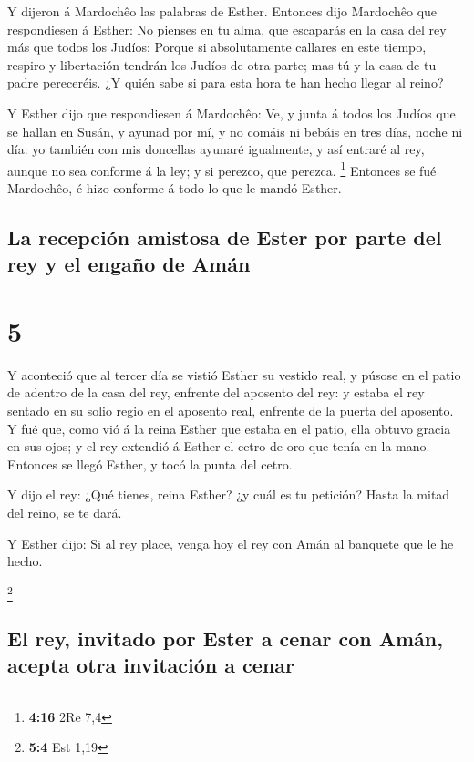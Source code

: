  Y dijeron á Mardochêo las palabras de Esther.
 Entonces dijo Mardochêo que respondiesen á Esther: No
pienses en tu alma, que escaparás en la casa del rey más que todos los
Judíos:  Porque si absolutamente callares en este tiempo,
respiro y libertación tendrán los Judíos de otra parte; mas tú y la casa
de tu padre pereceréis. ¿Y quién sabe si para esta hora te han hecho
llegar al reino?

 Y Esther dijo que respondiesen á Mardochêo: 
Ve, y junta á todos los Judíos que se hallan en Susán, y ayunad por mí,
y no comáis ni bebáis en tres días, noche ni día: yo también con mis
doncellas ayunaré igualmente, y así entraré al rey, aunque no sea
conforme á la ley; y si perezco, que perezca. \footnote{\textbf{4:16}
  2Re 7,4}  Entonces se fué Mardochêo, é hizo conforme á
todo lo que le mandó Esther.

\hypertarget{la-recepciuxf3n-amistosa-de-ester-por-parte-del-rey-y-el-engauxf1o-de-amuxe1n}{%
\subsection{La recepción amistosa de Ester por parte del rey y el engaño
de
Amán}\label{la-recepciuxf3n-amistosa-de-ester-por-parte-del-rey-y-el-engauxf1o-de-amuxe1n}}

\hypertarget{section-4}{%
\section{5}\label{section-4}}

 Y aconteció que al tercer día se vistió Esther su vestido
real, y púsose en el patio de adentro de la casa del rey, enfrente del
aposento del rey: y estaba el rey sentado en su solio regio en el
aposento real, enfrente de la puerta del aposento.  Y fué
que, como vió á la reina Esther que estaba en el patio, ella obtuvo
gracia en sus ojos; y el rey extendió á Esther el cetro de oro que tenía
en la mano. Entonces se llegó Esther, y tocó la punta del cetro.

 Y dijo el rey: ¿Qué tienes, reina Esther? ¿y cuál es tu
petición? Hasta la mitad del reino, se te dará.

 Y Esther dijo: Si al rey place, venga hoy el rey con Amán
al banquete que le he hecho.

\footnote{\textbf{5:4} Est 1,19}

\hypertarget{el-rey-invitado-por-ester-a-cenar-con-amuxe1n-acepta-otra-invitaciuxf3n-a-cenar}{%
\subsection{El rey, invitado por Ester a cenar con Amán, acepta otra
invitación a
cenar}\label{el-rey-invitado-por-ester-a-cenar-con-amuxe1n-acepta-otra-invitaciuxf3n-a-cenar}}


